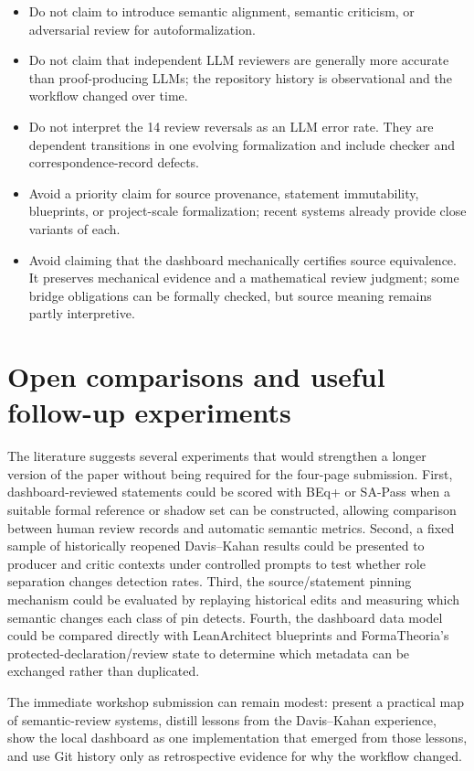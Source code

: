 \documentclass[11pt]{article}
\begin{document}
\begin{itemize}
  \item Do not claim to introduce semantic alignment, semantic criticism, or
  adversarial review for autoformalization.
  \item Do not claim that independent LLM reviewers are generally more accurate
  than proof-producing LLMs; the repository history is observational and the
  workflow changed over time.
  \item Do not interpret the 14 review reversals as an LLM error rate.  They are
  dependent transitions in one evolving formalization and include checker and
  correspondence-record defects.
  \item Avoid a priority claim for source provenance, statement immutability,
  blueprints, or project-scale formalization; recent systems already provide
  close variants of each.
  \item Avoid claiming that the dashboard mechanically certifies source
  equivalence.  It preserves mechanical evidence and a mathematical review
  judgment; some bridge obligations can be formally checked, but source meaning
  remains partly interpretive.
\end{itemize}

\section{Open comparisons and useful follow-up experiments}

The literature suggests several experiments that would strengthen a longer
version of the paper without being required for the four-page submission.
First, dashboard-reviewed statements could be scored with BEq+ or SA-Pass when a
suitable formal reference or shadow set can be constructed, allowing comparison
between human review records and automatic semantic metrics.  Second, a fixed
sample of historically reopened Davis--Kahan results could be presented to
producer and critic contexts under controlled prompts to test whether role
separation changes detection rates.  Third, the source/statement pinning
mechanism could be evaluated by replaying historical edits and measuring which
semantic changes each class of pin detects.  Fourth, the dashboard data model
could be compared directly with LeanArchitect blueprints and FormaTheoria's
protected-declaration/review state to determine which metadata can be exchanged
rather than duplicated.

The immediate workshop submission can remain modest: present a practical map
of semantic-review systems, distill lessons from the Davis--Kahan experience,
show the local dashboard as one implementation that emerged from those lessons,
and use Git history only as retrospective evidence for why the workflow changed.



\end{document}
